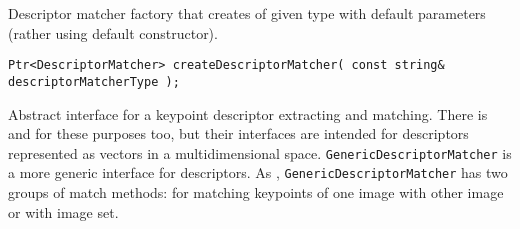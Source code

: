 Descriptor matcher factory that creates  of 
given type with default parameters (rather using default constructor).

\begin{lstlisting}
Ptr<DescriptorMatcher> createDescriptorMatcher( const string& descriptorMatcherType );
\end{lstlisting}

\begin{description}
\end{description}

Abstract interface for a keypoint descriptor extracting and matching. 
There is  and  
for these purposes too, but their interfaces are intended for descriptors 
represented as vectors in a multidimensional space. \texttt{GenericDescriptorMatcher} 
is a more generic interface for descriptors.
As , \texttt{GenericDescriptorMatcher} has two groups 
of match methods: for matching keypoints of one image with other image or
with image set.
 

